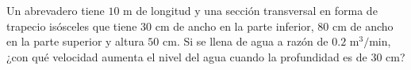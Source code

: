 \item Un abrevadero tiene $10 \text{ m}$ de longitud y una sección transversal en forma de trapecio isósceles que tiene $30 \text{ cm}$ de ancho en la parte inferior, $80 \text{ cm}$ de ancho en la parte superior y altura $50 \text{ cm}$. Si se llena de agua a razón de $0.2 \text{ m}^3/\text{min}$, ¿con qué velocidad aumenta el nivel del agua cuando la profundidad es de $30 \text{ cm}$?

